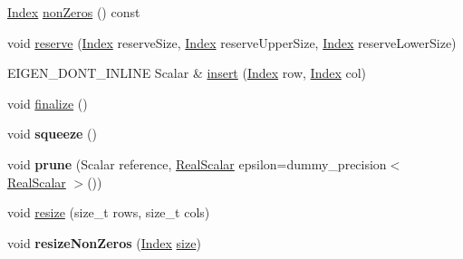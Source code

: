 \begin{DoxyCompactItemize}
\item 
\hyperlink{group___core___module_a554f30542cc2316add4b1ea0a492ff02}{Index} \hyperlink{class_eigen_1_1_skyline_matrix_aea6d3b694cef560f15a7d18c1f010604}{non\+Zeros} () const
\item 
void \hyperlink{class_eigen_1_1_skyline_matrix_aac6da20a87fca9d4cb6b871504497577}{reserve} (\hyperlink{group___core___module_a554f30542cc2316add4b1ea0a492ff02}{Index} reserve\+Size, \hyperlink{group___core___module_a554f30542cc2316add4b1ea0a492ff02}{Index} reserve\+Upper\+Size, \hyperlink{group___core___module_a554f30542cc2316add4b1ea0a492ff02}{Index} reserve\+Lower\+Size)
\item 
E\+I\+G\+E\+N\+\_\+\+D\+O\+N\+T\+\_\+\+I\+N\+L\+I\+NE Scalar \& \hyperlink{class_eigen_1_1_skyline_matrix_a6e2d550f29d0dd59f83aa9d568d92c23}{insert} (\hyperlink{group___core___module_a554f30542cc2316add4b1ea0a492ff02}{Index} row, \hyperlink{group___core___module_a554f30542cc2316add4b1ea0a492ff02}{Index} col)
\item 
void \hyperlink{class_eigen_1_1_skyline_matrix_a1269310d041fb3ca2a980644f3cfe5a2}{finalize} ()
\item 
\mbox{\label{class_eigen_1_1_skyline_matrix_a96b5819fc711164e746450262dae8693}} 
void {\bfseries squeeze} ()
\item 
\mbox{\label{class_eigen_1_1_skyline_matrix_afda234e34b8312fd2bf93fc4f6935cb3}} 
void {\bfseries prune} (Scalar reference, \hyperlink{class_eigen_1_1_skyline_matrix_base_a24c532ab7e339b956a637a4a968e1565}{Real\+Scalar} epsilon=dummy\+\_\+precision$<$ \hyperlink{class_eigen_1_1_skyline_matrix_base_a24c532ab7e339b956a637a4a968e1565}{Real\+Scalar} $>$())
\item 
void \hyperlink{class_eigen_1_1_skyline_matrix_a918eed5cc583f6d402f0db60c5c5ad52}{resize} (size\+\_\+t rows, size\+\_\+t cols)
\item 
\mbox{\label{class_eigen_1_1_skyline_matrix_a050a0ba5d47a1373a8ed9e1f7d02388e}} 
void {\bfseries resize\+Non\+Zeros} (\hyperlink{group___core___module_a554f30542cc2316add4b1ea0a492ff02}{Index} \hyperlink{class_eigen_1_1_skyline_matrix_base_a635234baea6bd59f97e6bd219adbdb64}{size})
\item 
\mbox{\label{class_eigen_1_1_skyline_matrix_a5615b6d198de88f00219877fbc4c9304}} 

\end{DoxyCompactItemize}
